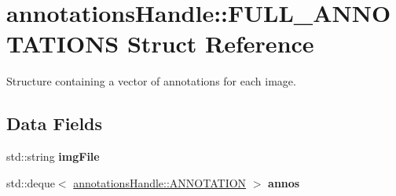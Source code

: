 \hypertarget{structannotationsHandle_1_1FULL__ANNOTATIONS}{
\section{annotationsHandle::FULL\_\-ANNOTATIONS Struct Reference}
\label{structannotationsHandle_1_1FULL__ANNOTATIONS}
}


Structure containing a vector of annotations for each image.  


\subsection*{Data Fields}
\begin{DoxyCompactItemize}
\item 
\hypertarget{structannotationsHandle_1_1FULL__ANNOTATIONS_a922e3ae7aec7f4bc7132b1c11fd63a3e}{
std::string {\bfseries imgFile}}
\label{structannotationsHandle_1_1FULL__ANNOTATIONS_a922e3ae7aec7f4bc7132b1c11fd63a3e}

\item 
\hypertarget{structannotationsHandle_1_1FULL__ANNOTATIONS_aaa9bdedf301998153c73ede6584887e0}{
std::deque$<$ \hyperlink{structannotationsHandle_1_1ANNOTATION}{annotationsHandle::ANNOTATION} $>$ {\bfseries annos}}
\label{structannotationsHandle_1_1FULL__ANNOTATIONS_aaa9bdedf301998153c73ede6584887e0}

\end{DoxyCompactItemize}
